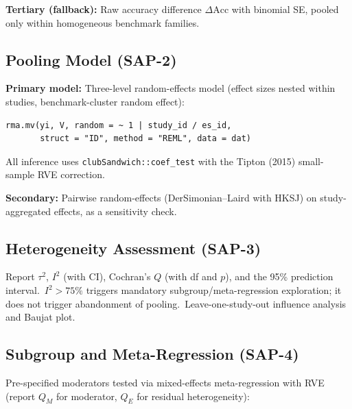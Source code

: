 \textbf{Tertiary (fallback):} Raw accuracy difference $\Delta\text{Acc}$ with binomial SE, pooled only within homogeneous benchmark families.

\subsection{Pooling Model (SAP-2)}

\textbf{Primary model:} Three-level random-effects model (effect sizes nested within studies, benchmark-cluster random effect):

\begin{verbatim}
rma.mv(yi, V, random = ~ 1 | study_id / es_id,
       struct = "ID", method = "REML", data = dat)
\end{verbatim}

All inference uses \texttt{clubSandwich::coef\_test} with the Tipton (2015) small-sample RVE correction.

\textbf{Secondary:} Pairwise random-effects (DerSimonian--Laird with HKSJ) on study-aggregated effects, as a sensitivity check.

\subsection{Heterogeneity Assessment (SAP-3)}

Report $\tau^2$, $I^2$ (with CI), Cochran's $Q$ (with df and $p$), and the 95\% prediction interval.\
$I^2 > 75\%$ triggers mandatory subgroup/meta-regression exploration; it does not trigger abandonment of pooling.\
Leave-one-study-out influence analysis and Baujat plot.

\subsection{Subgroup and Meta-Regression (SAP-4)}

Pre-specified moderators tested via mixed-effects meta-regression with RVE (report $Q_M$ for moderator, $Q_E$ for residual heterogeneity):

